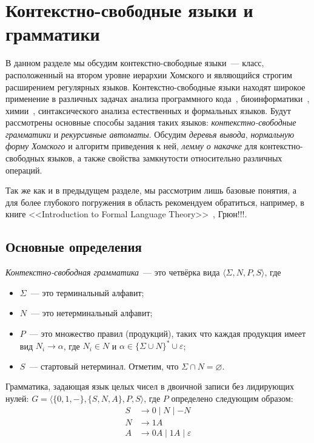 \setchapterpreamble[u]{\margintoc}
\chapter{Контекстно-свободные языки и грамматики}
\label{CFG}

В данном разделе мы обсудим контекстно-свободные языки~--- класс, расположенный на втором уровне иерархии Хомского и являющийся строгим расширением регулярных языков.
Контекстно-свободные языки находят широкое применение в различных задачах анализа программного кода~\cite{!!!}, биоинформатики~\cite{!!!}, химии~\cite{!!!}, синтаксического анализа естественных и формальных языков.
Будут рассмотрены основные способы задания таких языков: \emph{контекстно-свободные грамматики} и \emph{рекурсивные автоматы}.
Обсудим \emph{деревья вывода}, \emph{нормальную форму Хомского} и алгоритм приведения к ней, \emph{лемму о накачке} для контекстно-свободных языков, а также свойства замкнутости относительно различных операций.

Так же как и в предыдущем разделе, мы рассмотрим лишь базовые понятия, а для более глубокого погружения в область рекомендуем обратиться, например, в книге <<Introduction to Formal Language Theory>>~\cite{10.5555/578595}, Грюн!!!.

\section{Основные определения}

\begin{definition}
    \emph{Контекстно-свободная грамматика}~--- это четвёрка вида $\langle \Sigma, N, P, S \rangle$, где
    \begin{itemize}
        \item $\Sigma$~--- это терминальный алфавит;
        \item $N$~--- это нетерминальный алфавит;
        \item $P$~--- это множество правил (продукций), таких что каждая продукция имеет вид $N_i \to \alpha$, где $N_i \in N$ и $\alpha \in \{\Sigma \cup N\}^* \cup {\varepsilon}$;
        \item $S$~--- стартовый нетерминал.
              Отметим, что $\Sigma \cap N = \varnothing$.
    \end{itemize}
\end{definition}

\begin{example}
    \label{ex:binary_cfg}
    Грамматика, задающая язык целых чисел в двоичной записи без лидирующих нулей: $G = \langle \{0, 1, -\}, \{S, N, A\}, P, S \rangle$, где $P$ определено следующим образом:
    \begin{align*}
        S & \rightarrow 0 \mid N \mid - N              \\
        N & \rightarrow 1 A                            \\
        A & \rightarrow 0 A \mid 1 A  \mid \varepsilon
    \end{align*}
\end{example}


